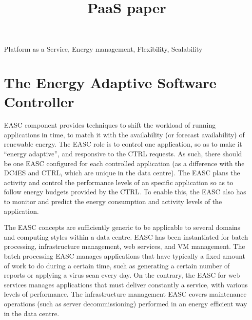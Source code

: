 \documentclass[10pt, conference, compsocconf]{IEEEtran}
\begin{document}
\title{PaaS paper}

\author{
\and
{}
}


\maketitle
\begin{abstract}

\end{abstract}

\begin{IEEEkeywords}
Platform as a Service, Energy management, Flexibility, Scalability
\end{IEEEkeywords}





\section{The Energy Adaptive Software Controller}

EASC component provides techniques to shift the workload of running applications in time, to match it with the availability (or forecast availability) of renewable energy. The EASC role is to control one application, so as to make it “energy adaptive”, and responsive to the CTRL requests. As such, there should be one EASC configured for each controlled application (as a difference with the DC4ES and CTRL, which are unique in the data centre). The EASC plans the activity and control the performance levels of an specific application so as to follow energy budgets provided by the CTRL. To enable this, the EASC also has to monitor and predict the energy consumption and activity levels of the application.

The EASC concepts are sufficiently generic to be applicable to several domains and computing styles within a data centre. EASC has been instantiated for batch processing, infrastructure management, web services, and VM management. The batch processing EASC manages applications that have typically a fixed amount of work to do during a certain time, such as generating a certain number of reports or applying a virus scan every day. On the contrary, the EASC for web services manages applications that must deliver constantly a service, with various levels of performance. The infrastructure management EASC covers maintenance operations (such as server decommissioning) performed in an energy efficient way in the data centre.
\end{document}
